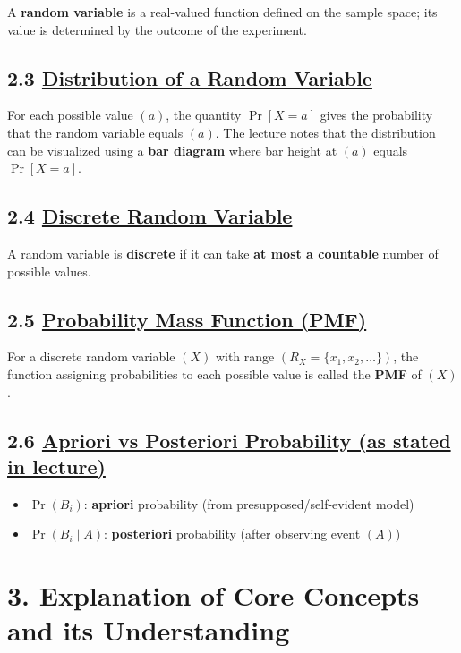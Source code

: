 \documentclass[11pt]{article}
\begin{document}
A \textbf{random variable} is a real-valued function defined on the sample space; its value is determined by the outcome of the experiment.

\vspace{0.5cm}
\subsection*{2.3 \underline{Distribution of a Random Variable}}

For each possible value $(a)$, the quantity $\Pr[X=a]$ gives the probability that the random variable equals $(a)$. The lecture notes that the distribution can be visualized using a \textbf{bar diagram} where bar height at $(a)$ equals $\Pr[X=a]$.

\vspace{0.5cm}
\subsection*{2.4 \underline{Discrete Random Variable}}

A random variable is \textbf{discrete} if it can take \textbf{at most a countable} number of possible values.

\vspace{0.5cm}
\subsection*{2.5 \underline{Probability Mass Function (PMF)}}

For a discrete random variable $(X)$ with range $(R_X=\{x_1,x_2,\dots\})$, the function assigning probabilities to each possible value is called the \textbf{PMF} of $(X)$.

\vspace{0.5cm}
\subsection*{2.6 \underline{Apriori vs Posteriori Probability (as stated in lecture)}}

\begin{itemize}
\item $\Pr(B_i)$: \textbf{apriori} probability (from presupposed/self-evident model)
\item $\Pr(B_i\mid A)$: \textbf{posteriori} probability (after observing event $(A)$)
\end{itemize}

\vspace{1cm}
\section*{3. Explanation of Core Concepts and its Understanding}
\end{document}
